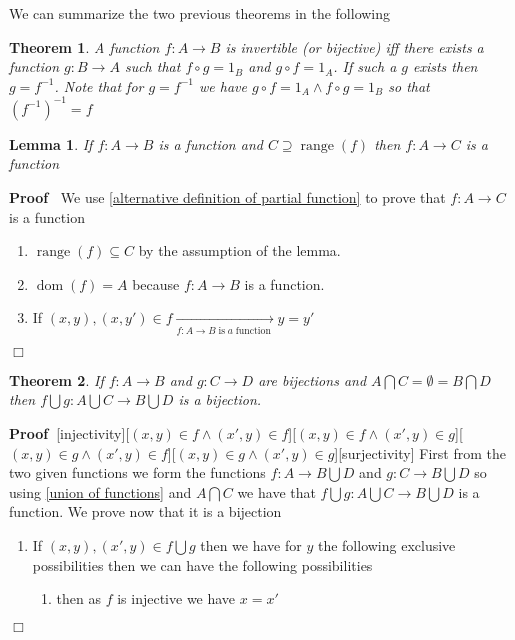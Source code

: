 \documentclass{book}
\newcommand{\Rightarrowlim}{\mathop{\rightarrow}\limits}
\newcommand{\tmop}[1]{\ensuremath{\operatorname{#1}}}
\newenvironment{proof}{\noindent\textbf{Proof\ }}{\hspace*{\fill}$\Box$\medskip}
\newtheorem{lemma}{Lemma}
\newtheorem{theorem}{Theorem}
\begin{document}
{{We can summarize the two previous theorems in the following

\begin{theorem}
  \label{condition for beeing a inversible function}A function $f : A
  \rightarrow B$ is invertible (or bijective) iff there exists a function $g :
  B \rightarrow A$ such that $f \circ g = 1_B$ and $g \circ f = 1_A$. If such
  a $g$ exists then $g = f^{- 1}$. Note that for $g = f^{- 1}$ we have $g
  \circ f = 1_A \wedge f \circ g = 1_B$ so that $(f^{- 1})^{- 1} = f$
\end{theorem}

\begin{lemma}
  \label{image restriction of a function is a function}If $f : A \rightarrow
  B$ is a function and $C \supseteq \tmop{range} (f)$ then $f : A \rightarrow
  C$ is a function
\end{lemma}

\begin{proof}
  We use \ref{alternative definition of partial function} to prove that $f : A
  \rightarrow C$ is a function
  \begin{enumerate}
    \item $\tmop{range} (f) \subseteq C$ by the assumption of the lemma.
    
    \item $\tmop{dom} (f) = A$ because $f : A \rightarrow B$ is a function.
    
    \item If $(x, y), (x, y') \in f \Rightarrowlim_{f : A \rightarrow B
    \tmop{is} a \tmop{function}} y = y'$
  \end{enumerate}
\end{proof}

\begin{theorem}
  \label{union of bijections}If $f : A \rightarrow B$ and $g : C \rightarrow
  D$ are bijections and $A \bigcap C = \emptyset = B \bigcap D$ then $f
  \bigcup g : A \bigcup C \rightarrow B \bigcup D$ is a bijection.
\end{theorem}

\begin{proof}[injectivity][$(x, y) \in f \wedge (x', y) \in f$][$(x, y) \in f
\wedge (x', y) \in g$][$(x, y) \in g \wedge (x', y) \in f$][$(x, y) \in g
\wedge (x', y) \in g$][surjectivity]
  First from the two given functions we form the functions $f : A \rightarrow
  B \bigcup D$ and $g : C \rightarrow B \bigcup D$ so using \ref{union of
  functions} and $A \bigcap C$ we have that $f \bigcup g : A \bigcup C
  \rightarrow B \bigcup D$ is a function. We prove now that it is a bijection
  \begin{enumerate}
    \item If $(x, y), (x', y) \in f \bigcup g$ then we have for $y$ the
    following exclusive possibilities then we can have the following
    possibilities
    \begin{enumerate}
      \item then as $f$ is injective we have $x = x'$
      

\end{enumerate}
\end{enumerate}
\end{proof}}}
\end{document}
